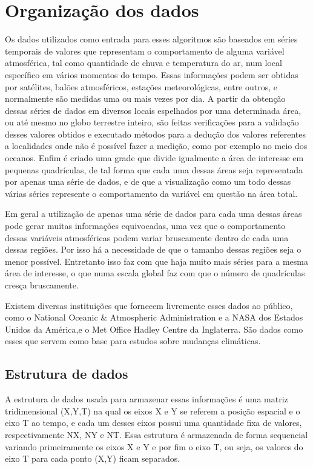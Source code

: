 \chapter{Organização dos dados}

Os dados utilizados como entrada para esses algoritmos são baseados em séries temporais de valores que representam o comportamento de alguma variável atmosférica, tal como quantidade de chuva e temperatura do ar, num local específico em vários momentos do tempo. Essas informações podem ser obtidas por satélites, balões atmosféricos, estações meteorológicas, entre outros, e normalmente são medidas uma ou mais vezes por dia. A partir da obtenção dessas séries de dados em diversos locais espelhados por uma determinada área, ou até mesmo no globo terrestre inteiro, são feitas verificações para a validação desses valores obtidos e executado métodos para a dedução dos valores referentes a localidades onde não é possível fazer a medição, como por exemplo no meio dos oceanos. Enfim é criado uma grade que divide igualmente a área de interesse em pequenas quadrículas, de tal forma que cada uma dessas áreas seja representada por apenas uma série de dados, e de que a visualização como um todo dessas várias séries represente o comportamento da variável em questão na área total. 

Em geral a utilização de apenas uma série de dados para cada uma dessas áreas pode gerar muitas informações equivocadas, uma vez que o comportamento dessas variáveis atmosféricas podem variar bruscamente dentro de cada uma dessas regiões. Por isso há a necessidade de que o tamanho dessas regiões seja o menor possível. Entretanto isso faz com que haja muito mais séries para a mesma área de interesse, o que numa escala global faz com que o número de quadrículas cresça bruscamente.

Existem diversas instituições que fornecem livremente esses dados ao público, como o National Oceanic \& Atmospheric Administration e a NASA \cite{NASA} dos Estados Unidos da América,e o Met Office Hadley Centre \cite{MOHC} da Inglaterra. São dados como esses que servem como base para estudos sobre mudanças climáticas.

\section{Estrutura de dados}

A estrutura de dados usada para armazenar essas informações é uma matriz tridimensional (X,Y,T) na qual os eixos X e Y se referem a posição espacial e o eixo T ao tempo, e cada um desses eixos possui uma quantidade fixa de valores, respectivamente NX, NY e NT. Essa estrutura é armazenada de forma sequencial variando primeiramente os eixos X e Y e por fim o eixo T, ou seja, os valores do eixo T para cada ponto (X,Y) ficam separados.

